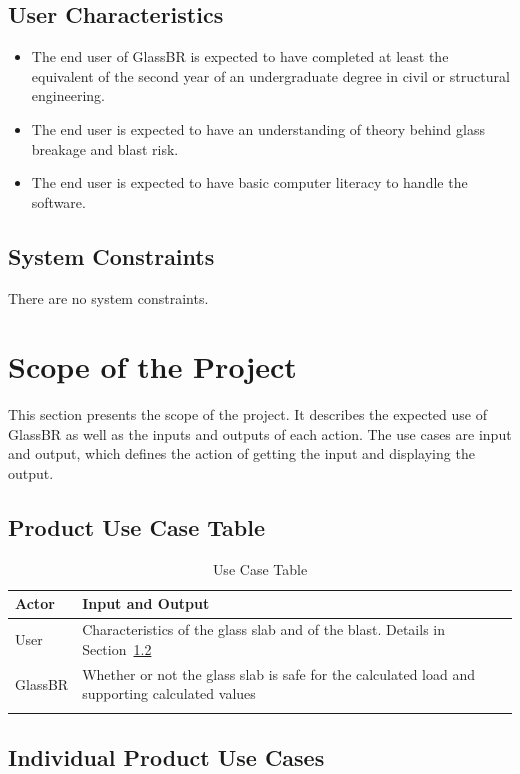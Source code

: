 \documentclass[12pt]{article}
\newcommand{\progname}{GlassBR}
\begin{document}
\subsection{User Characteristics} 
\label{sec_userchar}
\begin{itemize}
\item The end user of \progname{} is expected to have completed at least the
  equivalent of the second year of an undergraduate degree in civil or
  structural engineering.
\item The end user is expected to have an understanding of theory behind glass
  breakage and blast risk.
\item The end user is expected to have basic computer literacy to handle the
  software.
\end{itemize}

\subsection{System Constraints}

There are no system constraints.

\section{Scope of the Project}

This section presents the scope of the project. It describes the expected use of
\progname{} as well as the inputs and outputs of each action.  The use cases are
input and output, which defines the action of getting the input and displaying
the output.

\subsection{Product Use Case Table} \label{UseCase}

\begin{longtabu}{l X[l]}
\toprule
Actor & Input and Output
\\
\midrule
User & Characteristics of the glass slab and of the blast. Details in Section~\ref{sec_usecasedetails}
\\
\progname{} & Whether or not the glass slab is safe for the calculated load and supporting calculated values
\\
\bottomrule
\caption{Use Case Table}
\label{Table:UseCaseTabl}
\end{longtabu}
\subsection{Individual Product Use Cases}\label{sec_usecasedetails} 
\end{document}
